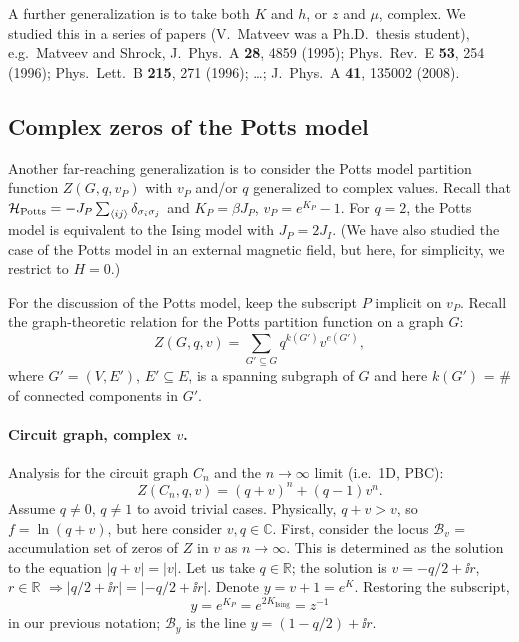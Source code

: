 A further generalization is to take both $K$ and $h$, or $z$ and $\mu$, complex. We studied this in a series of
papers (V.~Matveev was a Ph.D.\ thesis student), e.g.\ Matveev and Shrock, J.\ Phys.\ A \textbf{28}, 4859 (1995);
Phys.\ Rev.\ E \textbf{53}, 254 (1996); Phys.\ Lett.\ B \textbf{215}, 271 (1996); \ldots; J.\ Phys.\ A
\textbf{41}, 135002 (2008).

\subsection{Complex zeros of the Potts model}\label{sec:pottszeros}

Another far-reaching generalization is to consider the Potts model partition function $Z(G,q,v_P)$ with $v_P$
and/or $q$ generalized to complex values. Recall that $\mathcal{H}_{\text{Potts}} = -J_P\sum_{\langle ij\rangle}\delta_{\sigma_i\sigma_j}$
and $K_P = \beta J_P$, $v_P = e^{K_P}-1$. For $q = 2$, the Potts model is equivalent to the Ising model with
$J_P = 2J_I$. (We have also studied the case of the Potts model in an external magnetic field, but here, for
simplicity, we restrict to $H = 0$.)

For the discussion of the Potts model, keep the subscript $P$ implicit on $v_P$. Recall the graph-theoretic
relation for the Potts partition function on a graph $G$:
\begin{equation}
  Z(G,q,v) = \sum_{G'\subseteq G}q^{k(G')}v^{e(G')},
\end{equation}
where $G' = (V,E')$, $E'\subseteq E$, is a spanning subgraph of $G$ and here $k(G')$ = \# of connected components in
$G'$.

\paragraph{Circuit graph, complex $v$.} Analysis for the circuit graph $C_n$ and the $n\to\infty$ limit (i.e.\ 1D,
PBC):
\begin{equation}
  Z(C_n,q,v) = (q+v)^n + (q-1)v^n .
\end{equation}
Assume $q\ne 0$, $q\ne 1$ to avoid trivial cases. Physically, $q+v>v$, so $f = \ln(q+v)$, but here consider
$v,q\in\mathbb C$. First, consider the locus $\mathcal B_v$ = accumulation set of zeros of $Z$ in $v$ as
$n\to\infty$. This is determined as the solution to the equation $|q+v| = |v|$. Let us take $q\in\mathbb R$; the
solution is $v = -q/2+\ii r$, $r\in\mathbb R$ $\Rightarrow|q/2+\ii r| = |-q/2+\ii r|$. Denote
$y = v+1 = e^K$. Restoring the subscript,
\begin{equation}
  y = e^{K_P} = e^{2K_{\text{Ising}}} = z^{-1}
\end{equation}
in our previous notation; $\mathcal B_y$ is the line $y = \left(1-q/2\right)+\ii r$.

